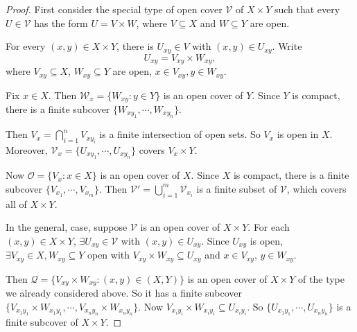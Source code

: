 \documentclass[a4paper]{article}
\begin{document}
\begin{proof}
  First consider the special type of open cover $\mathcal{V}$ of $X\times Y$ such that every $U\in \mathcal{V}$ has the form $U = V\times W$, where $V\subseteq X$ and $W\subseteq Y$ are open.

  For every $(x, y) \in X\times Y$, there is $U_{xy}\in V$ with $(x, y)\in U_{xy}$. Write
  \[
    U_{xy} = V_{xy}\times W_{xy},
  \]
  where $V_{xy}\subseteq X$, $W_{xy}\subseteq Y$ are open, $x\in V_{xy}, y\in W_{xy}$.

  Fix $x\in X$. Then $\mathcal{W}_x = \{W_{xy}: y\in Y\}$ is an open cover of $Y$. Since $Y$ is compact, there is a finite subcover $\{W_{xy_1}, \cdots, W_{xy_n}\}$.

  Then $V_x = \bigcap_{i = 1}^n V_{xy_i}$ is a finite intersection of open sets. So $V_x$ is open in $X$. Moreover, $\mathcal{V}_x = \{U_{xy_1},\cdots , U_{xy_n}\}$ covers $V_x \times Y$.

  \begin{center}
  \end{center}
  Now $\mathcal{O} = \{V_x: x\in X\}$ is an open cover of $X$. Since $X$ is compact, there is a finite subcover $\{V_{x_1}, \cdots, V_{x_m}\}$. Then $\mathcal{V}' = \bigcup_{i = 1}^m \mathcal{V}_{x_i}$ is a finite subset of $\mathcal{V}$, which covers all of $X\times Y$.

  In the general, case, suppose $\mathcal{V}$ is an open cover of $X\times Y$. For each $(x, y) \in X\times Y$, $\exists U_{xy}\in \mathcal{V}$ with $(x, y)\in U_{xy}$. Since $U_{xy}$ is open, $\exists V_{xy}\in X, W_{xy}\subseteq Y$ open with $V_{xy}\times W_{xy}\subseteq U_{xy}$ and $x\in V_{xy}$, $y\in W_{xy}$.

  Then $\mathcal{Q} = \{V_{xy}\times W_{xy}: (x, y)\in (X, Y)\}$ is an open cover of $X\times Y$ of the type we already considered above. So it has a finite subcover $\{V_{x_1y_1}\times W_{x_1y_1}, \cdots, V_{x_n y_n}\times W_{x_n y_n}\}$. Now $V_{x_iy_i} \times W_{x_iy_i} \subseteq U_{x_iy_i}$. So $\{U_{x_1y_1},\cdots,  U_{x_n y_n}\}$ is a finite subcover of $X\times Y$.
\end{proof}
\end{document}
